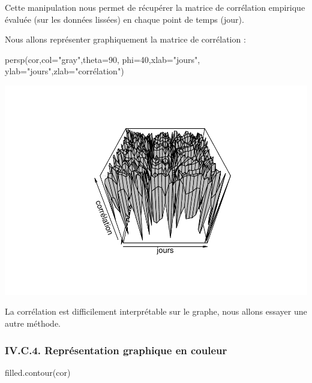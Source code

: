 \documentclass[
]{article}
\newenvironment{Shaded}{\begin{snugshade}}{\end{snugshade}}
\newcommand{\AttributeTok}[1]{\textcolor[rgb]{0.77,0.63,0.00}{#1}}
\newcommand{\DecValTok}[1]{\textcolor[rgb]{0.00,0.00,0.81}{#1}}
\newcommand{\FunctionTok}[1]{\textcolor[rgb]{0.00,0.00,0.00}{#1}}
\newcommand{\NormalTok}[1]{#1}
\newcommand{\StringTok}[1]{\textcolor[rgb]{0.31,0.60,0.02}{#1}}
\begin{document}
Cette manipulation nous permet de récupérer la matrice de corrélation
empirique évaluée (sur les données lissées) en chaque point de temps
(jour).

Nous allons représenter graphiquement la matrice de corrélation :

\begin{Shaded}
\begin{Highlighting}[]
\FunctionTok{persp}\NormalTok{(cor,}\AttributeTok{col=}\StringTok{"gray"}\NormalTok{,}\AttributeTok{theta=}\DecValTok{90}\NormalTok{,}
      \AttributeTok{phi=}\DecValTok{40}\NormalTok{,}\AttributeTok{xlab=}\StringTok{"jours"}\NormalTok{,}
      \AttributeTok{ylab=}\StringTok{"jours"}\NormalTok{,}\AttributeTok{zlab=}\StringTok{"corrélation"}\NormalTok{)}
\end{Highlighting}
\end{Shaded}

\includegraphics{Projet_CHESNAIS_GUIBERT_files/figure-latex/unnamed-chunk-42-1.pdf}

La corrélation est difficilement interprétable sur le graphe, nous
allons essayer une autre méthode.

\hypertarget{iv.c.4.-repruxe9sentation-graphique-en-couleur}{%
\subsubsection{IV.C.4. Représentation graphique en
couleur}\label{iv.c.4.-repruxe9sentation-graphique-en-couleur}}

\begin{Shaded}
\begin{Highlighting}[]
\FunctionTok{filled.contour}\NormalTok{(cor)}
\end{Highlighting}
\end{Shaded}
\end{document}
